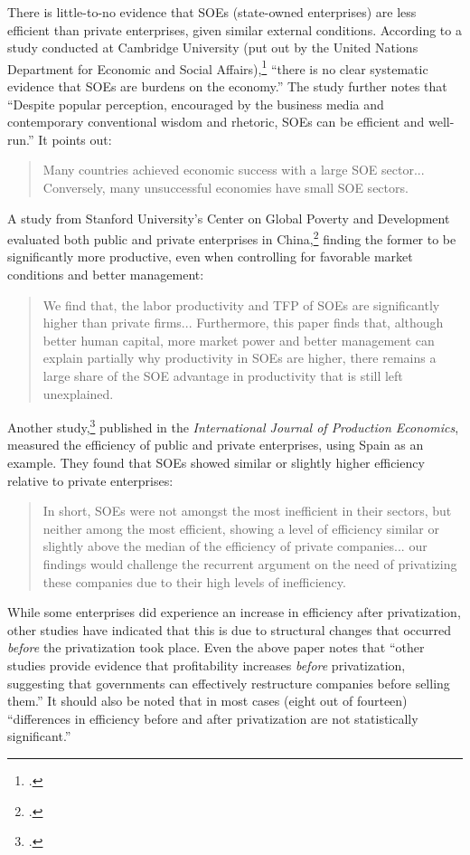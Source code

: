 There is little-to-no evidence that SOEs (state-owned enterprises) are less efficient than private enterprises, given similar external conditions.
According to a study conducted at Cambridge University (put out by the United Nations Department for Economic and Social Affairs),\footcite{ha-joon} ``there is no clear systematic evidence that SOEs are burdens on the economy.''
The study further notes that ``Despite popular perception, encouraged by the business media and contemporary conventional wisdom and rhetoric, SOEs can be efficient and well-run.''
It points out:
\begin{quote}
Many countries achieved economic success with a large SOE sector... Conversely, many unsuccessful economies have small SOE sectors.
\end{quote}
A study from Stanford University's Center on Global Poverty and Development evaluated both public and private enterprises in China,\footcite{soe-performance} finding the former to be significantly more productive, even when controlling for favorable market conditions and better management:
\begin{quote}
We find that, the labor productivity and TFP of SOEs are significantly higher than private firms... Furthermore, this paper finds that, although better human capital, more market power and better management can explain partially why productivity in SOEs are higher, there remains a large share of the SOE advantage in productivity that is still left unexplained.
\end{quote}
Another study,\footcite{soe-efficiency} published in the \textit{International Journal of Production Economics}, measured the efficiency of public and private enterprises, using Spain as an example.
They found that SOEs showed similar or slightly higher efficiency relative to private enterprises:
\begin{quote}
In short, SOEs were not amongst the most inefficient in their sectors, but neither among the most efficient, showing a level of efficiency similar or slightly above the median of the efficiency of private companies... our findings would challenge the recurrent argument on the need of privatizing these companies due to their high levels of inefficiency.
\end{quote}
While some enterprises did experience an increase in efficiency after privatization, other studies have indicated that this is due to structural changes that occurred \emph{before} the privatization took place.
Even the above paper notes that ``other studies provide evidence that profitability increases \emph{before} privatization, suggesting that governments can effectively restructure companies before selling them.''
It should also be noted that in most cases (eight out of fourteen) ``differences in efficiency before and after privatization are not statistically significant.''

